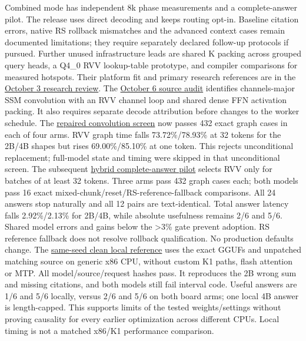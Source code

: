 \documentclass[10pt,a4paper]{article}
\begin{document}
Combined mode has independent 8k phase measurements and a
complete-answer pilot. The release uses direct decoding and keeps
routing opt-in. Baseline citation errors, native RS rollback mismatches
and the advanced context cases remain documented limitations; they
require separately declared follow-up protocols if pursued. Further
unused infrastructure leads are shared K packing across grouped query
heads, a Q4\_0 RVV lookup-table prototype, and compiler comparisons for
measured hotspots. Their platform fit and primary research references
are in the
\href{https://github.com/MoyaMryia/riscv-accl/blob/main/spacemit/reports/2026-10-03-infrastructure-research.md}{October
3 research review}. The
\href{https://github.com/MoyaMryia/riscv-accl/blob/main/spacemit/reports/2026-10-06-next-infrastructure-methods.md}{October
6 source audit} identifies channels-major SSM convolution with an RVV
channel loop and shared dense FFN activation packing. It also requires
separate decode attribution before changes to the worker schedule. The
\href{https://github.com/MoyaMryia/riscv-accl/blob/main/spacemit/reports/2026-10-06-ssm-conv-repaired-results.md}{repaired
convolution screen} now passes 432 exact graph cases in each of four
arms. RVV graph time falls 73.72\%/78.93\% at 32 tokens for the 2B/4B
shapes but rises 69.00\%/85.10\% at one token. This rejects
unconditional replacement; full-model state and timing were skipped in
that unconditional screen. The subsequent
\href{https://github.com/MoyaMryia/riscv-accl/blob/main/spacemit/reports/2026-10-06-ssm-complete-answer-results.md}{hybrid
complete-answer pilot} selects RVV only for batches of at least 32
tokens. Three arms pass 432 graph cases each; both models pass 16 exact
mixed-chunk/reset/RS-reference-fallback comparisons. All 24 answers stop
naturally and all 12 pairs are text-identical. Total answer latency
falls 2.92\%/2.13\% for 2B/4B, while absolute usefulness remains 2/6 and
5/6. Shared model errors and gains below the \textgreater3\% gate
prevent adoption. RS reference fallback does not resolve rollback
qualification. No production defaults change. The
\href{https://github.com/MoyaMryia/riscv-accl/blob/main/spacemit/reports/2026-10-06-local-clean-reference-results.md}{same-seed
clean local reference} uses the exact GGUFs and unpatched matching
source on generic x86 CPU, without custom K1 paths, flash attention or
MTP. All model/source/request hashes pass. It reproduces the 2B wrong
sum and missing citations, and both models still fail interval code.
Useful answers are 1/6 and 5/6 locally, versus 2/6 and 5/6 on both board
arms; one local 4B answer is length-capped. This supports limits of the
tested weights/settings without proving causality for every earlier
optimization across different CPUs. Local timing is not a matched x86/K1
performance comparison.
\end{document}
